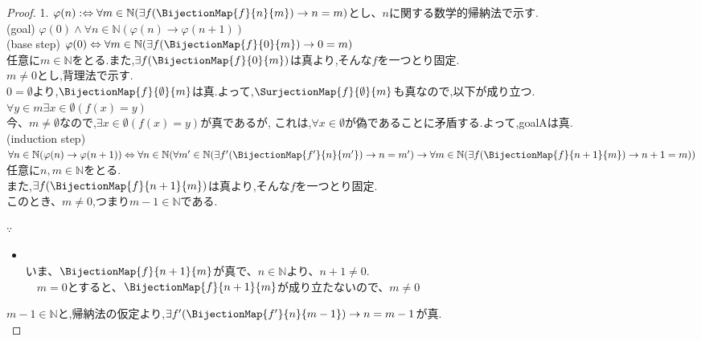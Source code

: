 \begin{proof} 1. $\varphi (n) :\Leftrightarrow \forall m \in \mathbb{N} (\exists f(\BijectionMap{f}{n}{m}) \rightarrow n = m)$とし、$n$に関する数学的帰納法で示す.\\

(goal) $\varphi (0) \land \forall n \in \mathbb{N} ( \varphi (n) \rightarrow \varphi (n+1))$\\

(base step) $\varphi (0) \Leftrightarrow  \forall m \in \mathbb{N}  (\exists f(\BijectionMap{f}{0}{m}) \rightarrow 0 = m)$ \\
任意に$m \in \mathbb{N}$をとる.また,$\exists f(\BijectionMap{f}{0}{m})$は真より,そんな$f$を一つとり固定.\\
$m \neq 0$とし,背理法で示す.\\
$ 0 = \emptyset$より,$\BijectionMap{f}{\emptyset}{m}$は真.よって,$\SurjectionMap{f}{\emptyset}{m}$も真なので,以下が成り立つ.\\
$\forall y \in m \exists x \in \emptyset (f(x) = y)$\\
今、$m \neq \emptyset$なので,$\exists x \in \emptyset (f(x) = y)$が真であるが,
これは,$\forall x \in \emptyset$が偽であることに矛盾する.よって,goalAは真.\\

(induction step) $\forall n \in \mathbb{N} ( \varphi (n) \rightarrow \varphi (n+1)) \\
\Leftrightarrow \forall n \in \mathbb{N}(\forall m' \in \mathbb{N}  (\exists f'(\BijectionMap{f'}{n}{m'}) \rightarrow  n = m') \rightarrow 
\forall m \in \mathbb{N}  (\exists f(\BijectionMap{f}{n+1}{m}) \rightarrow  n+1 = m))$ \\
任意に$n,m \in \mathbb{N}$をとる.\\
また,$\exists f(\BijectionMap{f}{n+1}{m})$は真より,そんな$f$を一つとり固定.\\
このとき、$m \neq 0$,つまり$m-1 \in \mathbb{N}$である.\\

\begin{sub-block}{{\boldmath $\because$}\,}
\begin{itemize}
\item[] \hspace{-0.5cm} \\
	いま、$\BijectionMap{f}{n+1}{m}$が真で、$n \in \mathbb{N}$より、$n+1 \neq 0$.\\
　$m = 0$とすると、$\BijectionMap{f}{n+1}{m}$が成り立たないので、$m \neq 0$
\end{itemize}
\end{sub-block}
$m-1 \in \mathbb{N}$と,帰納法の仮定より,$ \exists f'(\BijectionMap{f'}{n}{m-1})\rightarrow  n = m-1$が真.\\


\end{proof}
